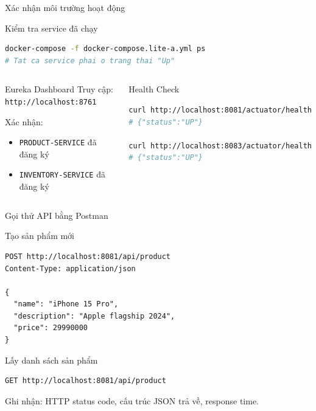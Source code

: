 \documentclass[aspectratio=169,12pt]{beamer}
\begin{document}
\begin{frame}[fragile]{Xác nhận môi trường hoạt động}
  \begin{block}{Kiểm tra service đã chạy}
\begin{lstlisting}[language=bash]
docker-compose -f docker-compose.lite-a.yml ps
# Tat ca service phai o trang thai "Up"
\end{lstlisting}
  \end{block}

  \begin{columns}
    \begin{block}{Eureka Dashboard}
      Truy cập: \texttt{http://localhost:8761}

      Xác nhận:
      \begin{itemize}
        \item \texttt{PRODUCT-SERVICE} đã đăng ký
        \item \texttt{INVENTORY-SERVICE} đã đăng ký
      \end{itemize}
    \end{block}

    \begin{block}{Health Check}
\begin{lstlisting}[language=bash]
curl http://localhost:8081/actuator/health
# {"status":"UP"}

curl http://localhost:8083/actuator/health
# {"status":"UP"}
\end{lstlisting}
    \end{block}
  \end{columns}
\end{frame}

\begin{frame}[fragile,shrink=8]{Gọi thử API bằng Postman}
  \begin{block}{Tạo sản phẩm mới}
\begin{lstlisting}[basicstyle=\ttfamily\scriptsize]
POST http://localhost:8081/api/product
Content-Type: application/json

{
  "name": "iPhone 15 Pro",
  "description": "Apple flagship 2024",
  "price": 29990000
}
\end{lstlisting}
  \end{block}

  \vspace{-0.4em}
  \begin{block}{Lấy danh sách sản phẩm}
\begin{lstlisting}[basicstyle=\ttfamily\scriptsize]
GET http://localhost:8081/api/product
\end{lstlisting}
  \end{block}

  \vspace{-0.3em}
  {\small Ghi nhận: HTTP status code, cấu trúc JSON trả về, response time.}
\end{frame}
\end{document}
